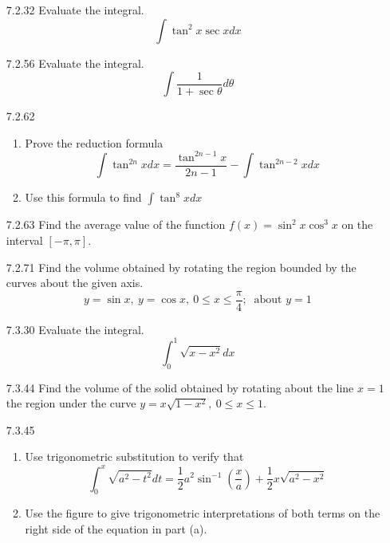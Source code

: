 \documentclass{article}
\begin{document}
\begin{enumerate}
\vspace{6cm}

\item[7.2.32]
    Evaluate the integral.
    \[
        \int \tan^{2}x \sec x dx
    \]
\newpage

\item[7.2.56]
    Evaluate the integral.
    \[
        \int \frac{1}{1 + \sec \theta} d\theta
    \]

\vspace{8cm}

\item[7.2.62]
    \begin{enumerate}
        \item Prove the reduction formula
        \[
            \int \tan^{2n} x dx = \frac{\tan^{2n-1} x }{2n-1}
            - \int \tan^{2n-2} x dx
        \]
        \item Use this formula to find $\displaystyle  \int \tan^{8}x dx$
    \end{enumerate}

\newpage

\item[7.2.63]
    Find the average value of the function $f(x) = \sin^{2}x \cos^{3}x$
    on the interval $[-\pi , \pi]$.

\vspace{6cm}

\item[7.2.71]
    Find the volume obtained by rotating the region bounded by the
    curves about the given axis.
    \[
        y = \sin x,\ y = \cos x,\
        0 \leqslant x \leqslant \frac{\pi}{4};\ \text{ about } y= 1
    \]

\vspace{6cm}

\item[7.3.30]
    Evaluate the integral.
    \[
        \int_{0}^{1} \sqrt{x-x^{2}} dx
    \]

\newpage

\item[7.3.44]
    Find the volume of the solid obtained by rotating about
    the line $x=1$ the region under the curve
    $y = x \sqrt{1-x^{2}},\ 0 \leqslant x \leqslant 1$.

\vspace{7cm}

\item[7.3.45]
    \begin{enumerate}
        \item Use trigonometric substitution to verify that
        \[
            \int_{0}^{x} \sqrt{a^{2}-t^{2}}dt
            = \frac{1}{2} a^{2} \sin^{-1} \left(\frac{x}{a}\right)
            + \frac{1}{2}x \sqrt{a^{2}-x^{2}}
        \]
        \item Use the figure to give trigonometric interpretations of
            both terms on the right side of the equation in part (a).
    \end{enumerate}


\end{enumerate}
\end{document}
